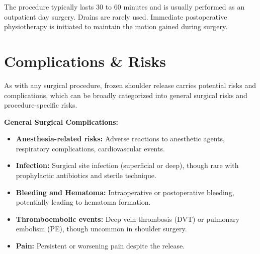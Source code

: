 The procedure typically lasts 30 to 60 minutes and is usually performed as an outpatient day surgery. Drains are rarely used. Immediate postoperative physiotherapy is initiated to maintain the motion gained during surgery.

\section*{Complications \& Risks}
As with any surgical procedure, frozen shoulder release carries potential risks and complications, which can be broadly categorized into general surgical risks and procedure-specific risks.

\textbf{General Surgical Complications:}
\begin{itemize}
  \item \textbf{Anesthesia-related risks:} Adverse reactions to anesthetic agents, respiratory complications, cardiovascular events.
  
  \item \textbf{Infection:} Surgical site infection (superficial or deep), though rare with prophylactic antibiotics and sterile technique.
  
  \item \textbf{Bleeding and Hematoma:} Intraoperative or postoperative bleeding, potentially leading to hematoma formation.
  
  \item \textbf{Thromboembolic events:} Deep vein thrombosis (DVT) or pulmonary embolism (PE), though uncommon in shoulder surgery.
  
  \item \textbf{Pain:} Persistent or worsening pain despite the release.
\end{itemize}

